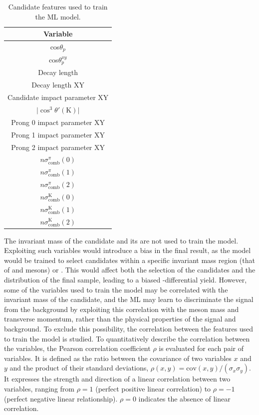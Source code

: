 \begin{table}[htb]
    \begin{center}
    \caption{Candidate features used to train the ML model.}
    \label{tab:ml_training_vars}
    \vspace*{0.3cm}
    \begin{tabular}{c}
         \toprule
         Variable\\
         \midrule         
         cos$\theta_{p}$\\
         cos$\theta_{p}^{xy}$\\
         Decay length\\
         Decay length XY\\
         Candidate impact parameter XY\\
         $\lvert \cos^{3}\theta'(\mathrm K)\rvert$\\
         Prong 0 impact parameter XY\\
         Prong 1 impact parameter XY\\
         Prong 2 impact parameter XY\\
         $n\sigma_\mathrm{comb}^{\pi}(0)$\\         
         $n\sigma_\mathrm{comb}^{\pi}(1)$\\
         $n\sigma_\mathrm{comb}^{\pi}(2)$\\
         $n\sigma_\mathrm{comb}^{\mathrm K}(0)$\\
         $n\sigma_\mathrm{comb}^{\mathrm K}(1)$\\
         $n\sigma_\mathrm{comb}^{\mathrm K}(2)$\\
         \bottomrule
    \end{tabular}
    \end{center}
\end{table}

The invariant mass of the candidate and its \pt are not used to train the model. Exploiting such variables would introduce a bias in the final result, as the model would be trained to select candidates within a specific invariant mass region (that of \ds and \dpl mesons) or \pt. This would affect both the selection of the candidates and the \pt distribution of the final sample, leading to a biased \pt-differential yield. However, some of the variables used to train the model may be correlated with the invariant mass of the candidate, and the ML may learn to discriminate the signal from the background by exploiting this correlation with the \ds meson mass and transverse momentum, rather than the physical properties of the signal and background. To exclude this possibility, the correlation between the features used to train the model is studied. To quantitatively describe the correlation between the variables, the Pearson correlation coefficient $\rho$ is evaluated for each pair of variables. It is defined as the ratio between the covariance of two variables $x$ and $y$ and the product of their standard deviations, $\rho(x,y) = \mathrm{cov}(x,y)/(\sigma_{x}\sigma_{y})$. It expresses the strength and direction of a linear correlation between two variables, ranging from $\rho = 1$ (perfect positive linear correlation) to $\rho = -1$ (perfect negative linear relationship). $\rho = 0$ indicates the absence of linear correlation.

